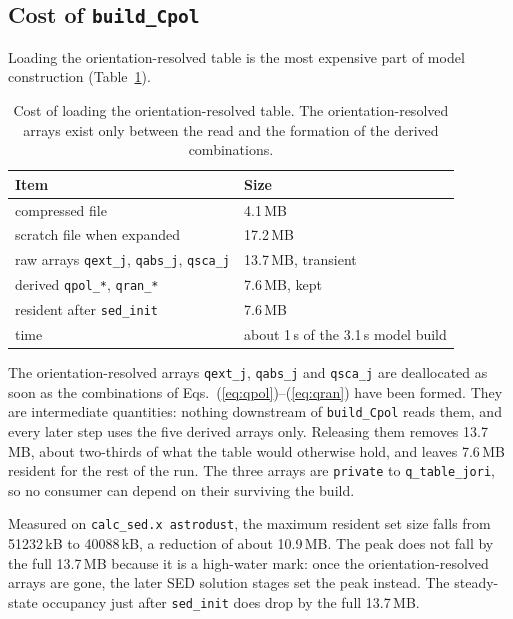 \documentclass{my_memo}
\newcommand{\code}[1]{\texttt{#1}}
\begin{document}
\subsection{Cost of \code{build\_Cpol}}

Loading the orientation-resolved table is the most expensive part of model
construction (Table~\ref{tab:cost}).

\begin{table}[h]
\centering
\begin{tabular}{@{}ll@{}}
\toprule
Item & Size \\
\midrule
compressed file          & 4.1\,MB \\
scratch file when expanded & 17.2\,MB \\
raw arrays \code{qext\_j}, \code{qabs\_j}, \code{qsca\_j} & 13.7\,MB, transient \\
derived \code{qpol\_*}, \code{qran\_*} & 7.6\,MB, kept \\
resident after \code{sed\_init} & 7.6\,MB \\
time                     & about 1\,s of the 3.1\,s model build \\
\bottomrule
\end{tabular}
\caption{Cost of loading the orientation-resolved table. The
orientation-resolved arrays exist only between the read and the formation
of the derived combinations.}
\label{tab:cost}
\end{table}

The orientation-resolved arrays \code{qext\_j}, \code{qabs\_j} and
\code{qsca\_j} are deallocated as soon as the combinations of
Eqs.~(\ref{eq:qpol})--(\ref{eq:qran}) have been formed. They are intermediate
quantities: nothing downstream of \code{build\_Cpol} reads them, and every
later step uses the five derived arrays only. Releasing them removes
13.7\,MB, about two-thirds of what the table would otherwise hold, and leaves
7.6\,MB resident for the rest of the run. The three arrays are \code{private}
to \code{q\_table\_jori}, so no consumer can depend on their surviving the
build.

Measured on \code{calc\_sed.x astrodust}, the maximum resident set size falls from
51232\,kB to 40088\,kB, a reduction of about 10.9\,MB. The peak does not fall by the full 13.7\,MB because it
is a high-water mark: once the orientation-resolved arrays are gone, the
later SED solution stages set the peak instead. The steady-state occupancy
just after \code{sed\_init} does drop by the full 13.7\,MB.

\end{document}
